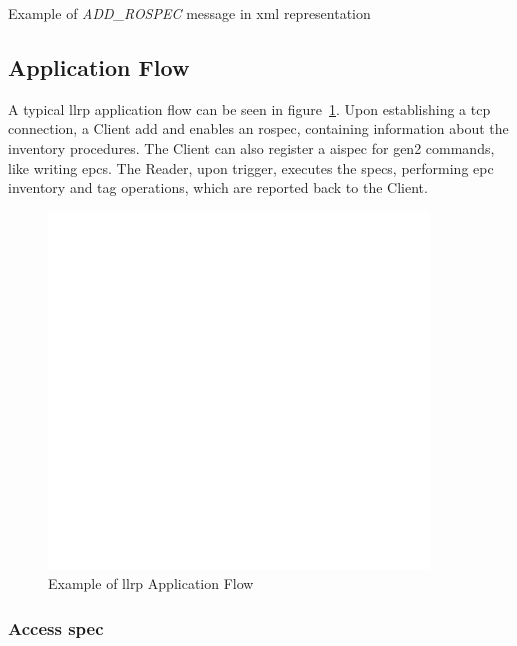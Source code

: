\begin{listing}
    \inputminted[linenos]{xml}{./code/sota/llrp_messages/ROSPEC.xml}
    \caption{Example of \textit{ADD\_ROSPEC} message in \ac{xml} representation}
    \label{code:rospec}
\end{listing}

\subsection{Application Flow}

A typical \ac{llrp} application flow can be seen in figure~\ref{fig:llrpflow}. Upon establishing a \ac{tcp} connection, a Client add and enables an \ac{rospec}, containing information about the inventory procedures. The Client can also register a \ac{aispec} for \ac{gen2} commands, like writing \acp{epc}.
The Reader, upon trigger, executes the \acp{spec}, performing \ac{epc} inventory and tag operations, which are reported back to the Client.

\begin{figure}[!ht]
    \centering
    \includegraphics[width=0.9\textwidth]{./figs/02-state-of-the-art/llrpflow.pdf}
    \caption[Example of \ac{llrp} Application Flow]{Example of \ac{llrp} Application Flow~\cite{ImpinjLTKProgrammers}} 
    \label{fig:llrpflow}
\end{figure}


\subsubsection{Access \acl{spec}}

